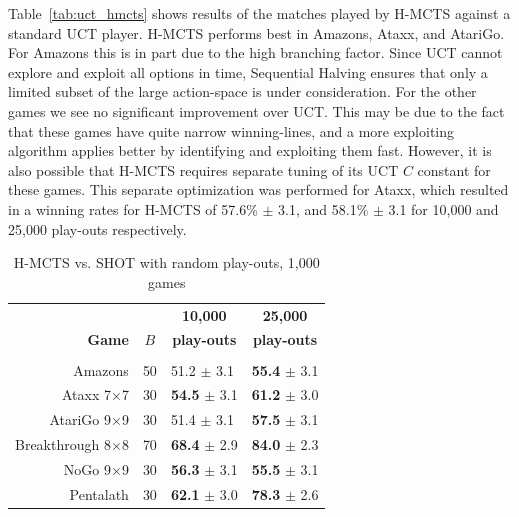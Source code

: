 \documentclass[a4paper]{llncs}
\begin{document}
Table~\ref{tab:uct_hmcts} shows results of the matches played by H-MCTS against a standard UCT player. H-MCTS performs best in Amazons, Ataxx, and AtariGo. For Amazons this is in part due to the high branching factor. Since UCT cannot explore and exploit all options in time, Sequential Halving ensures that only a limited subset of the large action-space is under consideration. For the other games we see no significant improvement over UCT. This may be due to the fact that these games have quite narrow winning-lines, and a more exploiting algorithm applies better by identifying and exploiting them fast. However, it is also possible that H-MCTS requires separate tuning of its UCT $C$ constant for these games. This separate optimization was performed for Ataxx, which resulted in a winning rates for H-MCTS of 57.6\% $\pm$ 3.1, and 58.1\% $\pm$ 3.1 for 10,000 and 25,000 play-outs respectively.

\begin{table}[ht]
\centering
\tabcolsep=0.3cm
\begin{tabular}{rlll}
\hline
\multicolumn{2}{c|}{} & \multicolumn{1}{c}{\textbf{10,000}} & \multicolumn{1}{c}{\textbf{25,000}} \\ 
\textbf{Game} & \multicolumn{1}{c|}{\textbf{$B$}} & \multicolumn{1}{c}{\textbf{play-outs}} & \multicolumn{1}{c}{\textbf{play-outs}} \\ [1mm] 
\cline{1-4}
\multicolumn{2}{c|}{} \\ [-3mm]
Amazons &\multicolumn{1}{l|}{50}			    	& 51.2 $\pm$ 3.1 			& {\bf{55.4}} $\pm$ 3.1 	\\ [.5mm] 
Ataxx 7$\times$7 &\multicolumn{1}{l|}{30} 			& {\bf{54.5}} $\pm$ 3.1		& {\bf{61.2}} $\pm$ 3.0 	 \\ [.5mm] 
AtariGo 9$\times$9 &\multicolumn{1}{l|}{30} 		& 51.4 $\pm$ 3.1 			& {\bf{57.5}} $\pm$ 3.1		\\ [.5mm] 
Breakthrough 8$\times$8 &\multicolumn{1}{l|}{70}	& {\bf{68.4}} $\pm$ 2.9  	& {\bf{84.0}} $\pm$ 2.3 	\\ [.5mm] 
NoGo 9$\times$9 &\multicolumn{1}{l|}{30} 			& {\bf{56.3}} $\pm$ 3.1 	& {\bf{55.5}} $\pm$ 3.1 	\\ [.5mm] 
Pentalath &\multicolumn{1}{l|}{30} 		  			& {\bf{62.1}} $\pm$ 3.0		& {\bf{78.3}} $\pm$ 2.6  	\\ [.5mm] 
\hline
\end{tabular}
\vspace{3mm}
{\caption{H-MCTS vs. SHOT with random play-outs, 1,000 games} \label{tab:shot_hmcts}}
\end{table}
\end{document}

